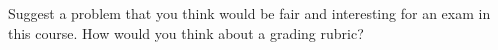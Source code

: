 \documentclass[12pt, leqno]{article}
\begin{document}

Suggest a problem that you think would be fair and interesting for an exam in
this course.  How would you think about a grading rubric?
\end{document}
